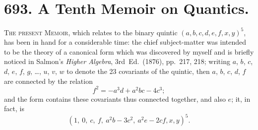 \documentclass[11pt,a4paper]{book}
\providecommand{\between}{,}
\begin{document}
\section*{693. A Tenth Memoir on Quantics.}
\label{paper:693}


\bigskip

\textsc{The present Memoir}, which relates to the binary quintic $(a, b, c, d, e, f \between x, y)^5$, has been in hand for a considerable time: the chief subject-matter was intended to be the theory of a canonical form which was discovered by myself and is briefly noticed in Salmon's \textit{Higher Algebra}, 3rd~Ed.\ (1876), pp.~217, 218; writing $a$, $b$, $c$, $d$, $e$, $f$, $g$, \ldots, $u$, $v$, $w$ to denote the 23 covariants of the quintic, then $a$, $b$, $c$, $d$, $f$ are connected by the relation
\[
f^2 = -a^3 d + a^2 bc - 4c^3;
\]
and the form contains these covariants thus connected together, and also $e$; it, in fact, is
\[
(1,\ 0,\ c,\ f,\ a^2 b - 3c^2,\ a^2 e - 2cf \between x, y)^5.
\]
\end{document}
